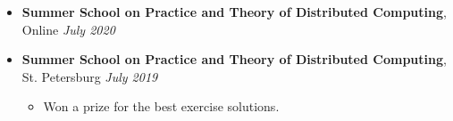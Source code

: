 \documentclass[10pt,a4paper]{extarticle}
\newcommand\whitestar{\raisebox{0.5pt}{\ensuremath{\medwhitestar}}}
\def\lnk#1#2{\href{#1}{\textcolor{darkblue}{\tbf{\textit{\underline{#2}}}}}}
\def\tbf{\textbf}
\def\lrg#1{\large\textbf{#1}\normalsize}
\def\headline#1{\vspace{0pt}\bigskip\hbox to \hsize{\hrulefill\quad\lower.3em\hbox{\lrg{\textsc{#1}}}\quad\hrulefill}\bigskip\vspace{-2pt}}
\newenvironment{reslist}
  {\vspace{-6pt}
  \begin{itemize}[label={\textcolor{blue}{$\mathbf{\diamond}$}},leftmargin=12pt]}
  {\end{itemize}
  \vspace{-0pt}}
\newcommand{\resRaw}[1]{
  \vspace{2pt}
  \item #1\normalsize
  \vspace{-4pt}
}
\def\resTime#1#2{
  \resRaw {
    \tbf{#1} \hspace*{\fill} \textit{#2}
  }
}
\def\resLocTime#1#2#3{
  \resRaw {
    \tbf{#1}, #2 \hspace*{\fill} \textit{#3}
  }
}
\def\beginres{\begin{itemize}[label=\raisebox{0.5ex}{\tiny$\bullet$}]}
\def\endres{\end{itemize}\vspace{-6pt}}
\def\subres{\vspace{0pt}\item}
\begin{document}
\begin{reslist}
  \resLocTime{Summer School on Practice and Theory of Distributed Computing}{Online}{July 2020}

  \resLocTime{Summer School on Practice and Theory of Distributed Computing}{St. Petersburg}{July 2019}
  \beginres
    \subres Won a prize for the best exercise solutions.
  \endres
\end{reslist}




%
\end{document}
